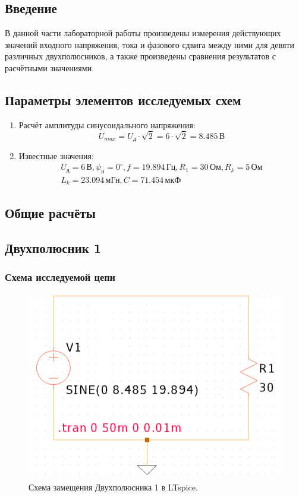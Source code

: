 \subsection{Введение}
В данной части лабораторной работы произведены измерения действующих значений входного напряжения, тока и фазового сдвига между ними для девяти различных двухполюсников, а также произведены сравнения результатов с расчётными значениями.

\subsection{Параметры элементов исследуемых схем}
\begin{enumerate}
	\item Расчёт амплитуды синусоидального напряжения:
	      \[
		      U_{max} =  U_{\text{д}} \cdot \sqrt{2} = 6 \cdot \sqrt{2} = 8.485 \, \text{В}
	      \]

	\item Известные значения:
	      \[
		      \begin{gathered}
			      U_{\text{д}} = 6 \, \text{В}, \psi_{\text{н}} = 0^{\circ}, f = 19.894 \, \text{Гц}, R_1 = 30 \, \text{Ом}, R_k = 5 \, \text{Ом} \\
			      L_k = 23.094 \, \text{мГн}, C = 71.454 \, \text{мкФ}
		      \end{gathered}
	      \]

\end{enumerate}

\subsection{Общие расчёты}


\subsection{Двухполюсник 1}
\subsubsection{Схема исследуемой цепи}
\begin{figure}[H]
	\centering
	\includegraphics[width=1\textwidth]{./data/schema1}
	\caption{Схема замещения Двухполюсника 1 в LTspice.}
\end{figure}
